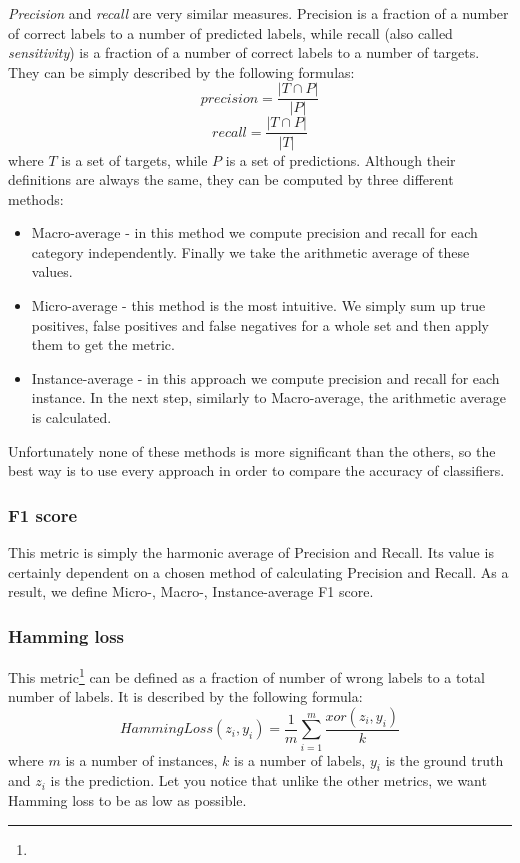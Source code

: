 \textit{Precision} and \textit{recall} are very similar measures. Precision is a fraction of a number of correct labels to a number of predicted labels, while recall (also called \textit{sensitivity}) is a fraction of a number of correct labels to a number of targets. They can be simply described by the following formulas:  
\begin{equation}
\label{eq:exp2}
precision=\frac{|T \cap P|}{|P|}
\end{equation}
\begin{equation}
\label{eq:exp3}
recall=\frac{|T \cap P|}{|T|}
\end{equation}
where $T$ is a set of targets, while $P$ is a set of predictions. Although their definitions are always the same, they can be computed by three different methods:
\begin{itemize}
\item Macro-average - in this method we compute precision and recall for each category independently. Finally we take the arithmetic average of these values.
\item Micro-average - this method is the most intuitive. We simply sum up true positives, false positives and false negatives for a whole set and then apply them to get the metric. 
\item Instance-average - in this approach we compute precision and recall for each instance. In the next step, similarly to Macro-average, the arithmetic average is calculated.
\end{itemize}

Unfortunately none of these methods is more significant than the others, so the best way is to use every approach in order to compare the accuracy of classifiers.  

\subsubsection{F1 score}

This metric is simply the harmonic average of Precision and Recall. Its value is certainly dependent on a chosen method of calculating Precision and Recall. As a result, we define Micro-, Macro-, Instance-average F1 score. 

\subsubsection{Hamming loss}

This metric\footnote{} can be defined as a fraction of number of wrong labels to a total number of labels. It is described by the following formula:
\begin{equation}
\label{eq:exp1}
    HammingLoss(z_i, y_i)=\frac{1}{m}\sum\limits_{i=1}^{m}\frac{xor(z_i,y_i)}{k}
\end{equation}
where $m$ is a number of instances, $k$ is a number of labels, $y_{i}$ is the ground truth and $z_{i}$ is the prediction. Let you notice that unlike the other metrics, we want Hamming loss to be as low as possible.  

